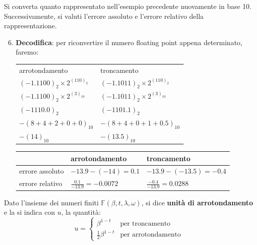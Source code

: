 \documentclass{article}
\begin{document}
\begin{example}
    Si converta quanto rappresentato nell'esempio precedente nuovamente in
    base 10. Successivamente, si valuti l'errore assoluto e l'errore relativo
    della rappresentazione.
    \begin{enumerate}
        \setcounter{enumi}{5}
        \item\textbf{Decodifica}: per riconvertire il numero floating point
            appena determinato, faremo:
            \begin{center}
                 \begin{tabular}{ll}
                     arrotondamento & troncamento \\ 
                     $(-1.1100)_2\times2^{(110)_2}$ & $(-1.1011)_2\times2^{(110)_2}$ \\ 
                     $(-1.1100)_2\times2^{(3)_{10}}$ & $(-1.1011)_2\times2^{(3)_{10}}$ \\ 
                     $(-1110.0)_2$ & $(-1101.1)_2$ \\ 
                     $-(8+4+2+0+0)_{10}$ & $-(8+4+0+1+0.5)_{10}$ \\ 
                     $-(14)_{10}$ & $-(13.5)_{10}$ \\ 
                 \end{tabular}
            \end{center}
            \begin{center}
                \begin{tabular}{l|l|l}
                    & arrotondamento & troncamento \\
                    \hline
                    errore assoluto & $-13.9 - (-14) = 0.1$ & $-13.9 - (-13.5) = -0.4$ \\
                    \hline
                    errore relativo & $\frac{0.1}{-13.9} = -0.0072$ & $\frac{-0.4}{-13.9} = 0.0288$
                \end{tabular} 
            \end{center}
   \end{enumerate} 
\end{example}
\begin{definition}
    Dato l'insieme dei numeri finiti $\mathbb{F}(\beta,t,\lambda,\omega)$, si
    dice \textbf{unità di arrotondamento} e la si indica con $u$, la quantità:
    $$u=\begin{cases}
        \beta^{1-t} & \text{per troncamento} \\ 
        \frac{1}{2}\beta^{1-t} & \text{per arrotondamento}
    \end{cases}$$
\end{definition}
\end{document}
